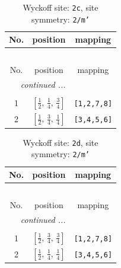 \documentclass[fleqn,8pt]{jsarticle}
\begin{document}
\renewcommand{\arraystretch}{1.2}
\begin{longtable}{ccc}
\caption{Wyckoff site: {\tt 2c}, site symmetry: {\tt 2/m'}}
 \\
 \hline \hline
No. & position & mapping \\ \hline \endfirsthead

\multicolumn{2}{l}{\tablename\ \thetable{}} \\
 \hline \hline
No. & position & mapping \\ \hline \endhead

 \hline \hline
\multicolumn{2}{r}{\footnotesize\it continued ...} \\ \endfoot

 \hline \hline
\multicolumn{2}{r}{} \\ \endlastfoot

1 & $\left[ \frac{1}{2},\, \frac{1}{4},\, \frac{3}{4} \right]$ & {\tt [1,2,7,8]} \\ \hline
2 & $\left[ \frac{1}{2},\, \frac{3}{4},\, \frac{1}{4} \right]$ & {\tt [3,4,5,6]} \\
\end{longtable}
\renewcommand{\arraystretch}{1.2}
\begin{longtable}{ccc}
\caption{Wyckoff site: {\tt 2d}, site symmetry: {\tt 2/m'}}
 \\
 \hline \hline
No. & position & mapping \\ \hline \endfirsthead

\multicolumn{2}{l}{\tablename\ \thetable{}} \\
 \hline \hline
No. & position & mapping \\ \hline \endhead

 \hline \hline
\multicolumn{2}{r}{\footnotesize\it continued ...} \\ \endfoot

 \hline \hline
\multicolumn{2}{r}{} \\ \endlastfoot

1 & $\left[ \frac{1}{2},\, \frac{3}{4},\, \frac{3}{4} \right]$ & {\tt [1,2,7,8]} \\ \hline
2 & $\left[ \frac{1}{2},\, \frac{1}{4},\, \frac{1}{4} \right]$ & {\tt [3,4,5,6]} \\
\end{longtable}
\renewcommand{\arraystretch}{1.2}
\end{document}
